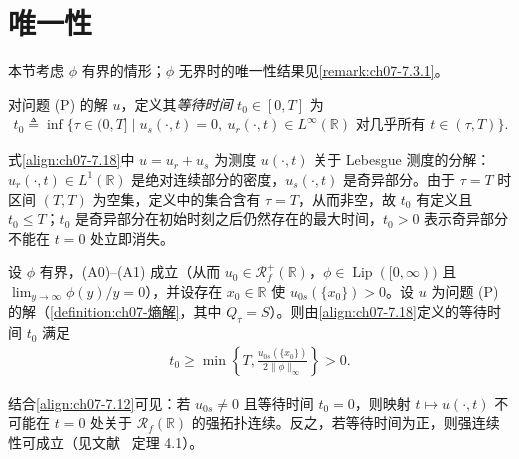 \documentclass[../../main.tex]{subfiles}%
\begin{document}
\section{唯一性}\label{section:ch07-唯一性}

本节考虑 $\phi$ 有界的情形；$\phi$ 无界时的唯一性结果见\hyperref[remark:ch07-7.3.1]{\cref{remark:ch07-7.3.1}}。

对问题 (P) 的解 $u$，定义其\emph{等待时间} $t_0\in[0,T]$ 为
\begin{align}
t_0\triangleq\inf\{\tau\in(0,T]\mid u_s(\cdot,t)=0,\ u_r(\cdot,t)\in L^\infty(\mathbb{R})
\text{ 对几乎所有 }t\in(\tau,T)\}. \label{align:ch07-7.18}
\end{align}

式\eqref{align:ch07-7.18}中 $u=u_r+u_s$ 为测度 $u(\cdot,t)$ 关于 Lebesgue 测度的分解：$u_r(\cdot,t)\in L^1(\mathbb{R})$ 是绝对连续部分的密度，$u_s(\cdot,t)$ 是奇异部分。由于 $\tau=T$ 时区间 $(T,T)$ 为空集，定义中的集合含有 $\tau=T$，从而非空，故 $t_0$ 有定义且 $t_0\leqslant T$；$t_0$ 是奇异部分在初始时刻之后仍然存在的最大时间，$t_0>0$ 表示奇异部分不能在 $t=0$ 处立即消失。

\begin{proposition}\label{proposition:ch07-7.2.1}
设 $\phi$ 有界，(A0)--(A1) 成立（从而 $u_0\in\mathscr{R}_f^+(\mathbb{R})$，$\phi\in\operatorname{Lip}([0,\infty))$ 且 $\lim_{y\to\infty}\phi(y)/y=0$），并设存在 $x_0\in\mathbb{R}$ 使 $u_{0s}(\{x_0\})>0$。设 $u$ 为问题 (P) 的解（\cref{definition:ch07-熵解}，其中 $Q_\tau=S$）。则由\eqref{align:ch07-7.18}定义的等待时间 $t_0$ 满足
\begin{align}
t_0\geqslant\min\left\{T,\frac{u_{0s}(\{x_0\})}{2\|\phi\|_\infty}\right\}>0. \label{align:ch07-7.19}
\end{align}
\end{proposition}

\begin{remark}\label{remark:ch07-7.2.1}
结合\eqref{align:ch07-7.12}可见：若 $u_{0s}\neq0$ 且等待时间 $t_0=0$，则映射 $t\mapsto u(\cdot,t)$ 不可能在 $t=0$ 处关于 $\mathscr{R}_f(\mathbb{R})$ 的强拓扑连续。反之，若等待时间为正，则强连续性可成立（见文献~\cite{ref18} 定理 4.1）。
\end{remark}
\end{document}
